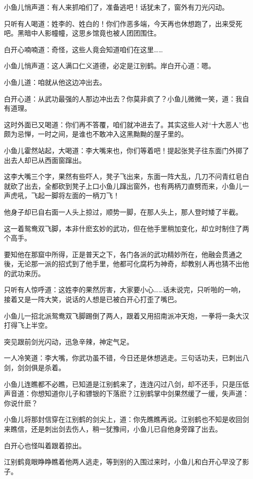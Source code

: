 \documentclass[12pt,oneside]{book}
\begin{document}
小鱼儿悄声道：有人来抓咱们了，准备逃吧！话犹未了，窗外有刀光闪动。

只听有人喝道：姓李的、姓白的！你们作恶多端，今天再也休想跑了，出来受死吧。黑暗中人影幢幢，这思乡馆竟也被人团团围住。

白开心喃喃道：奇怪，这些人竟会知道咱们在这里\ldots\ldots{}

小鱼儿悄声道：这人满口仁义道德，必定是江别鹤。岸白开心道：嗯。

小鱼儿道：咱就从他这边冲出去。

白开心道：从武功最强的人那边冲出去？你莫非疯了？小鱼儿微微一笑，道：我自有道理。

这时外面已又喝道：你们再不答覆，咱们就冲进去了。其实这些人对``十大恶人''也颇为忌惮，一时之间，是谁也不敢冲入这黑黝黝的屋子里的。

小鱼儿霍然站起，大喝道：李大嘴来也，你们等着吧！提起张凳子往东面门外掷了出去人却已从西面窗蹿出。

这李大嘴三个字，果然有些吓人，凳子飞出来，东面一阵大乱，几刀不问青红皂白就砍了出去，全都砍到凳子上口小鱼儿蹿出窗外，也有两柄刀直劈而来，小鱼儿一声虎吼，飞起一脚将左面的一柄刀飞！

他身子却已自右面一人头上掠过，顺势一脚，在那人头上，那人登时矮了半截。

这一着鸳鸯双飞脚，本非什麽玄妙的武功，但在他手里稍加变化，却立时制住了两个高手。

要知他在那窟中所得，正是普天之下，各门各派的武功精妙所在，他融会贯通之後，无论那一派的招式到了他手里，他都可化腐朽为神奇，却教别人再也猜不出他的武功来历。

只听有人惊呼道：这姓李的果然厉害，大家要小心\ldots\ldots 话未说完，只听啪的一响，接着又是一阵大笑，说话的人想是已被白开心打歪了嘴巴。

小鱼儿一招北派鸳鸯双飞脚踢倒了两人，跟着又用招南派冲天炮，一拳将一条大汉打得飞上半空。

突见跟前剑光闪动，迅急辛辣，神定气足。

一人冷笑道：李大嘴，你武功虽不错，今日还是休想逃走。三句话功夫，已刺出八剑，剑剑俱是杀着。

小鱼儿连瞧都不必瞧，已知道是江别鹤来了，连连闪过八剑，却不还手，只是压低声音道：你想知道你儿子和镖银的下落麽？江别鹤掌中剑果然缓了一缓，失声道：你说什麽？

小鱼儿将那封信穿在江别鹤的剑尖上，道：你先瞧瞧再说。江别鹤也不知是收回剑来瞧信，还是刺出剑去伤人，稍一犹豫间，小鱼儿已自他身旁蹿了出去。

白开心也怪叫着跟着掠出。

江别鹤竟眼睁睁瞧着他两人逃走，等到别的入围过来时，小鱼儿和白开心早没了影子。
\end{document}
